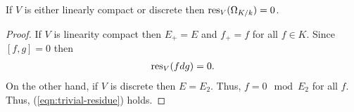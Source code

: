 \begin{proposition}\label{prop:residue-trivial-tate-space}
	If $V$ is either linearly compact or discrete then $\operatorname{res}_{V}(\Omega_{K/k}) = 0$.
\end{proposition}
\begin{proof}
	If $V$ is linearity compact then $E_{+} = E$ and $f_{+} = f$ for all $f \in K$. Since $[f,g] = 0$ then 
	\begin{align}\label{eqn:trivial-residue}
		\operatorname{res}_{V}(fdg) = 0.
	\end{align}
	On the other hand, if $V$ is discrete then $E = E_{2}$. Thus, $f = 0 \mod E_{2}$ for all $f$. Thus, (\ref{eqn:trivial-residue}) holds.
\end{proof}



